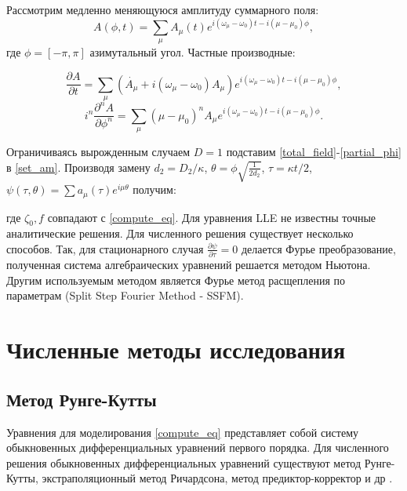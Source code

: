 Рассмотрим медленно меняющуюся амплитуду суммарного поля:
\begin{equation}\label{total_field}
A(\phi,t)=\sum_\mu A_\mu(t)e^{i(\omega_\mu-\omega_0)t-i(\mu-\mu_0)\phi},
\end{equation}
где $\phi=[-\pi,\pi]$ азимутальный угол. Частные производные:

\begin{equation}\label{partial_t}
\frac{\partial A}{\partial t}=\sum_\mu(\dot{A_\mu}+i(\omega_\mu-\omega_0)A_\mu)e^{i(\omega_\mu-\omega_0)t-i(\mu-\mu_0)\phi},
\end{equation}
\begin{equation}\label{partial_phi}
i^n\frac{\partial^n A}{\partial \phi^n}=\sum_\mu(\mu-\mu_0)^n A_\mu e^{i(\omega_\mu-\omega_0)t-i(\mu-\mu_0)\phi}.
\end{equation}

Ограничиваясь вырожденным случаем $D=1$ подставим \eqref{total_field}-\eqref{partial_phi} в \eqref{set_am}. Производя замену $d_2=D_2/\kappa$, $\theta=\phi\sqrt{\frac{1}{2d_2}}$, $\tau=\kappa t/2$, $\psi(\tau,\theta)=\sum a_\mu(\tau)e^{i\mu\theta}$ получим:


где $\zeta_0, f$ совпадают с \eqref{compute_eq}. Для уравнения LLE не известны точные аналитические решения. Для численного решения существует несколько способов. Так, для стационарного случая \cite{dissipative_solitons} $\frac{\partial \psi}{\partial \tau}=0$ делается Фурье преобразование, полученная система алгебраических уравнений решается методом Ньютона. Другим используемым методом является Фурье метод расщепления по параметрам (Split Step Fourier Method - SSFM).

\section{Численные методы исследования}

\subsection{Метод Рунге-Кутты}
Уравнения для моделирования \eqref{compute_eq} представляет собой систему обыкновенных дифференциальных уравнений первого порядка. Для численного решения обыкновенных дифференциальных уравнений существуют метод Рунге-Кутты, экстраполяционный метод Ричардсона, метод предиктор-корректор и др \cite{Numercial_recipes}.

